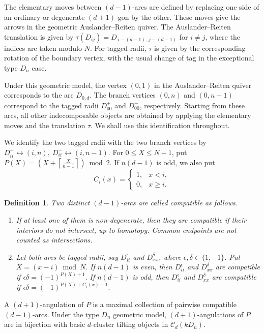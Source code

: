 \documentclass[12pt]{article}
\theoremstyle{plain}
\newtheorem{Def}{Definition}[section]
\theoremstyle{definition}
\renewcommand{\leq}{\leqslant}
\renewcommand{\geq}{\geqslant}
\begin{document}
The elementary moves between \((d-1)\)-arcs are defined by replacing one side of
an ordinary or degenerate \((d+1)\)-gon by the other. These moves give the
arrows in the geometric Auslander--Reiten quiver. The Auslander--Reiten
translation is given by
\(\tau(D_{ij})=D_{\,i-(d-1),\,j-(d-1)}\)
for \(i\neq j\), where the indices are taken modulo \(N\). For tagged radii,
\(\tau\) is given by the corresponding rotation of the boundary vertex, with
the usual change of tag in the exceptional type \(D_n\) case.

Under this geometric model, the vertex \((0,1)\) in the Auslander--Reiten
quiver corresponds to the arc \(D_{0,d}\). The branch vertices \((0,n)\) and
\((0,n-1)\) correspond to the tagged radii \(D_{00}^{+}\) and \(D_{00}^{-}\),
respectively. Starting from these arcs, all other indecomposable objects are
obtained by applying the elementary moves and the translation \(\tau\). We shall
use this identification throughout.

We identify the two tagged radii with the two branch vertices by
\(D_{ii}^{+}\leftrightarrow (i,n),\ D_{ii}^{-}\leftrightarrow (i,n-1).\)
For \(0\leq X\leq N-1\), put
\(P(X)=\left(X+\left\lceil\frac{X}{n-1}\right\rceil\right)\bmod 2.\)
If \(n(d-1)\) is odd, we also put
\[
C_i(x)=
\begin{cases}
1,& x<i,\\
0,& x\geq i.
\end{cases}
\]

\begin{Def}
Two distinct \((d-1)\)-arcs are called compatible as follows.
\begin{enumerate}
\item If at least one of them is non-degenerate, then they are compatible if
their interiors do not intersect, up to homotopy. Common endpoints are not
counted as intersections.

\item Let both arcs be tagged radii, say \(D_{ii}^{\epsilon}\) and
\(D_{xx}^{\delta}\), where \(\epsilon,\delta\in\{1,-1\}\). Put
\(X=(x-i)\bmod N.\)
If \(n(d-1)\) is even, then \(D_{ii}^{\epsilon}\) and \(D_{xx}^{\delta}\) are
compatible if
\(\epsilon\delta=(-1)^{P(X)+1}.\)
If \(n(d-1)\) is odd, then \(D_{ii}^{\epsilon}\) and \(D_{xx}^{\delta}\) are
compatible if
\(\epsilon\delta=(-1)^{P(X)+C_i(x)+1}.\)
\end{enumerate}
\end{Def}

A \((d+1)\)-angulation of \(P\) is a maximal collection of pairwise compatible
\((d-1)\)-arcs. Under the type \(D_n\) geometric model, \((d+1)\)-angulations of
\(P\) are in bijection with basic \(d\)-cluster tilting objects in
\(\mathcal C_d(kD_n)\).
\fi 
\end{document}

